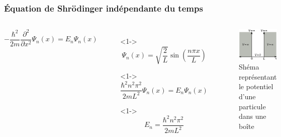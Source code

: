 \documentclass{beamer}
\begin{document}
\begin{frame}
\frametitle{Équation de Shrödinger indépendante du temps}

\begin{columns}

\begin{equation}\tag{4}
-\frac{\hbar^2}{2m}\frac{\partial^2}{\partial x^2}\Psi_n(x)=E_n\Psi_n(x)
\end{equation} 

\begin{itemize}
\item[]<1-> \begin{equation}\tag{5}
\Psi_n(x)=\sqrt{\frac{2}{L}}\sin(\frac{n\pi x}{L})
\end{equation}  
\item[]<1-> \begin{equation}\tag{6}
\frac{\hbar^2n^2\pi^2}{2mL^2}  \Psi_n(x)=E_n\Psi_n(x)
\end{equation}  

\item[]<1-> \begin{equation}\tag{8}
E_n=\frac{\hbar^2n^2\pi^2}{2mL^2} 
\end{equation} 

\end{itemize}
\begin{figure}[h]
\includegraphics[scale=0.4]{Pot}
\caption{Shéma représentant le potentiel d'une particule dans une boîte}
\end{figure}
\end{columns}

\end{frame}
\end{document}
